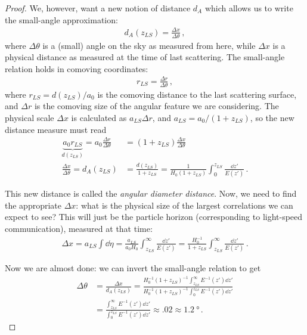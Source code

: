 \documentclass[main.tex]{subfiles}
\begin{document}
\begin{proof}
We, however, want a new notion of distance \(d_A\) which allows us to write the small-angle approximation: 
%
\begin{align}
d_A (z_{LS}) = \frac{ \Delta x}{\Delta \theta }
\,,
\end{align}
%
where \(\Delta \theta \) is a (small) angle on the sky as measured from here, while \(\Delta x\) is a physical distance as measured at the time of last scattering. The small-angle relation holds in comoving coordinates: 
%
\begin{align}
r_{LS} = \frac{\Delta r}{\Delta \theta }
\,,
\end{align}
%
where \(r_{LS} = d(z_{LS}) / a_0 \) is the comoving distance to the last scattering surface, and \(\Delta r\) is the comoving size of the angular feature we are considering. 
The physical scale \(\Delta x\) is calculated as \(a_{LS} \Delta r\), and \(a_{LS} = a_0 / (1+z_{LS})\), so the new distance measure must read 
%
\begin{align}
\underbrace{a_0 r_{LS}}_{d(z_{LS})} = a_0 \frac{\Delta r}{\Delta \theta } &= (1+z_{LS}) \frac{\Delta x}{\Delta \theta }  \\
\frac{\Delta x}{\Delta \theta } = d_A (z_{LS}) &= \frac{d(z_{LS})}{1 + z_{LS}} = \frac{1}{H_0 (1+z_{LS})} \int_{0}^{z_{LS}} \frac{ \dd{z'}}{E(z')}
\,.
\end{align}
 
This new distance is called the \emph{angular diameter distance}. 
Now, we need to find the appropriate \(\Delta x\): what is the physical size of the largest correlations we can expect to see? 
This will just be the particle horizon (corresponding to light-speed communication), measured at that time: 
%
\begin{align}
\Delta x = a_{LS} \int \dd{\eta } = \frac{a_{LS}}{a_0 H_0 } \int_{z_{LS}}^{\infty } \frac{ \dd{z'}}{E(z')} = \frac{H_0^{-1}}{1 + z_{LS}} \int_{z_{LS}}^{\infty } \frac{ \dd{z'}}{E(z')}
\,.
\end{align}

Now we are almost done: we can invert the small-angle relation to get 
%
\begin{align}
\Delta \theta &= \frac{\Delta x}{d_A(z_{LS})} 
= \frac{H_0^{-1} (1+z_{LS})^{-1} \int_{z_{LS}}^{\infty } E^{-1} (z') \dd{z'}}{H_0^{-1} (1+z_{LS})^{-1} \int_0^{z_{LS}} E^{-1} (z') \dd{z'}}  \\
&= \frac{\int_{z_{LS}}^{\infty } E^{-1} (z') \dd{z'}}{\int_0^{z_{LS}} E^{-1} (z') \dd{z'}} \approx \num{.02} \approx \SI{1.2}{\degree}
\,.
\end{align}


\end{proof}
\end{document}
